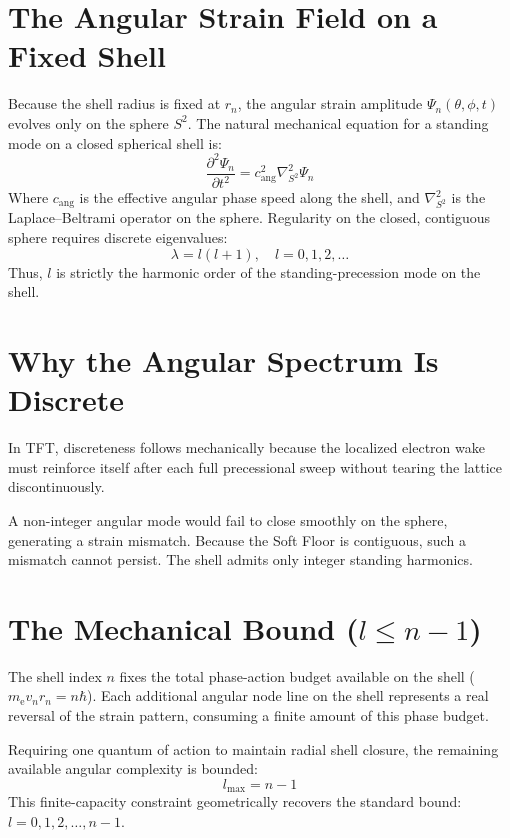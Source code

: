\section{The Angular Strain Field on a Fixed Shell}
Because the shell radius is fixed at $r_n$, the angular strain amplitude $\Psi_n (\theta,\phi,t)$ evolves only on the sphere $S^2$. The natural mechanical equation for a standing mode on a closed spherical shell is:
\begin{equation}
    \frac{\partial^2 \Psi_n}{\partial t^2} = c_{\mathrm{ang}}^2 \nabla_{S^2}^2 \Psi_n
\end{equation}
Where $c_{\mathrm{ang}}$ is the effective angular phase speed along the shell, and $\nabla_{S^2}^2$ is the Laplace--Beltrami operator on the sphere. Regularity on the closed, contiguous sphere requires discrete eigenvalues:
\begin{equation}
    \lambda = l(l+1), \quad l=0,1,2,\dots
\end{equation}
Thus, $l$ is strictly the harmonic order of the standing-precession mode on the shell.

\section{Why the Angular Spectrum Is Discrete}
In TFT, discreteness follows mechanically because the localized electron wake must reinforce itself after each full precessional sweep without tearing the lattice discontinuously.

A non-integer angular mode would fail to close smoothly on the sphere, generating a strain mismatch. Because the Soft Floor is contiguous, such a mismatch cannot persist. The shell admits only integer standing harmonics.

\section{The Mechanical Bound ($l \leq n-1$)}
The shell index $n$ fixes the total phase-action budget available on the shell ($m_{\mathrm{e}} v_n r_n = n\hbar$). Each additional angular node line on the shell represents a real reversal of the strain pattern, consuming a finite amount of this phase budget.

Requiring one quantum of action to maintain radial shell closure, the remaining available angular complexity is bounded:
\begin{equation}
    l_{\mathrm{max}} = n - 1
\end{equation}
This finite-capacity constraint geometrically recovers the standard bound: $l = 0, 1, 2, \dots, n-1$.

